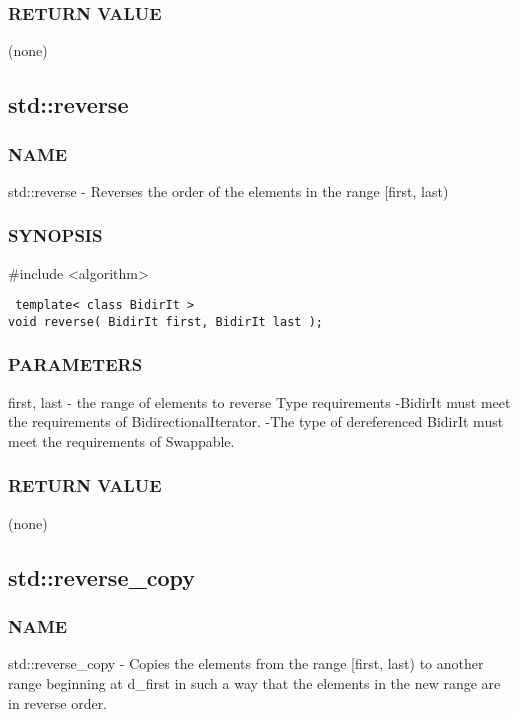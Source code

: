 \subsubsection{RETURN VALUE}
(none)



\subsection{std::reverse}

\subsubsection{NAME}
std::reverse - Reverses the order of the elements in the range [first, last)

\subsubsection{SYNOPSIS}
\#include <algorithm>

\begin{lstlisting}
 template< class BidirIt >
void reverse( BidirIt first, BidirIt last );
\end{lstlisting}

\subsubsection{PARAMETERS}
first, last - the range of elements to reverse
 Type requirements
 -BidirIt must meet the requirements of BidirectionalIterator.
 -The type of dereferenced BidirIt must meet the requirements of Swappable.

\subsubsection{RETURN VALUE}
(none)



\subsection{std::reverse\_copy}

\subsubsection{NAME}
std::reverse\_copy - Copies the elements from the range [first, last) to another range beginning at d\_first in such a way that the elements in the new range are in reverse order.

